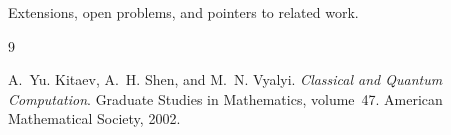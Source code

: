 \documentclass[12pt]{memoir}
\theoremstyle{definition}
\theoremstyle{plain}
\theoremstyle{remark}
\numberwithin{equation}{section}
\begin{document}
Extensions, open problems, and pointers to related work.


\begin{thebibliography}{9}

  A.~Yu. Kitaev, A.~H. Shen, and M.~N. Vyalyi.
  \emph{Classical and Quantum Computation}.
  Graduate Studies in Mathematics, volume~47.
  American Mathematical Society, 2002.

\end{thebibliography}
\end{document}
